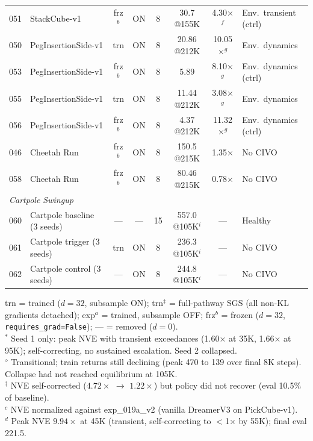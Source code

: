 \begin{table}[t]
\begin{tabular}{llcccccl}
051 & StackCube-v1 & frz$^b$ & ON & 8 & 30.7 @155K & 4.30$\times$$^f$ & Env.\ transient (ctrl) \\
050 & PegInsertionSide-v1 & trn & ON & 8 & 20.86 @212K & 10.05$\times$$^g$ & Env.\ dynamics \\
053 & PegInsertionSide-v1 & frz$^b$ & ON & 8 & 5.89 & 8.10$\times$$^g$ & Env.\ dynamics (ctrl) \\
055 & PegInsertionSide-v1 & trn & ON & 8 & 11.44 @212K & 3.08$\times$$^g$ & Env.\ dynamics \\
056 & PegInsertionSide-v1 & frz$^b$ & ON & 8 & 4.37 @212K & 11.32$\times$$^g$ & Env.\ dynamics (ctrl) \\
046 & Cheetah Run & frz$^b$ & ON & 8 & 150.5 @215K & 1.35$\times$ & No CIVO \\
058 & Cheetah Run & frz$^b$ & ON & 8 & 80.46 @215K & 0.78$\times$ & No CIVO \\
\midrule
\multicolumn{8}{l}{\textit{Cartpole Swingup}} \\
060 & Cartpole baseline (3 seeds) & --- & --- & 15 & 557.0 @105K$^i$ & --- & Healthy \\
061 & Cartpole trigger (3 seeds) & trn & ON & 8 & 236.3 @105K$^i$ & --- & No CIVO \\
062 & Cartpole control (3 seeds) & --- & ON & 8 & 244.8 @105K$^i$ & --- & No CIVO \\
\bottomrule
\end{tabular}
\vspace{1pt}
{\raggedright\footnotesize
trn = trained ($d{=}32$, subsample ON);
trn$^\ddagger$ = full-pathway SGS (all non-KL gradients detached);
exp$^a$ = trained, subsample OFF;
frz$^b$ = frozen ($d{=}32$, \texttt{requires\_grad=False});
--- = removed ($d{=}0$).\\
$^*$ Seed 1 only: peak NVE with transient exceedances (1.60$\times$ at 35K, 1.66$\times$ at 95K); self-correcting, no sustained escalation. Seed 2 collapsed.\\
$^\diamond$ Transitional; train returns still declining (peak 470 to 139 over final 8K steps). Collapse had not reached equilibrium at 105K.\\
$^\dagger$ NVE self-corrected ($4.72\times$ $\to$ $1.22\times$) but policy did not recover (eval 10.5\% of baseline).\\
$^c$ NVE normalized against exp\_019a\_v2 (vanilla DreamerV3 on PickCube-v1).\\
$^d$ Peak NVE $9.94\times$ at 45K (transient, self-correcting to $<$1$\times$ by 55K); final eval 221.5.\\
}
\end{table}
